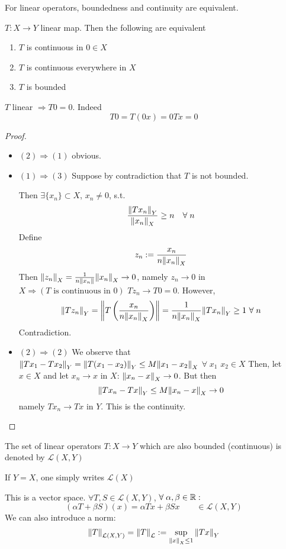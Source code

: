 For linear operators, boundedness and continuity are equivalent.
\begin{theorem}
    \(T:X \to Y\) linear map. Then the following are equivalent
    \begin{enumerate}
        \item \(T\) is continuous in \(0 \in X\)
        \item \(T\) is continuous everywhere in \(X\)
        \item \(T\) is bounded
    \end{enumerate}
\end{theorem}
\begin{remark}
    \(T\) linear \(\Rightarrow T0 = 0\). Indeed
    \[
        T0 = T(0x) =  0 Tx = 0
    \]
\end{remark}
\begin{proof}
    
    \begin{itemize}
        \item \((2) \Rightarrow (1)\) obvious.
        \item \((1) \Rightarrow (3)\) Suppose by contradiction that \(T\) is not bounded. 
        
        Then \(\exists \{ x_n \} \subset X \), \(x_n \neq 0\), s.t. 
        \[
            \frac{\norm{T x_n}_Y}{\norm{x_n}_X} \geq n \quad \forall\; n
        \]
        Define
        \[
            z_n := \frac{x_n}{n \norm{x_n}_X}
        \]
        Then \(\norm{z_n }_X = \frac{1}{n \norm{x_n}} \norm{x_n}_X \to 0\),
        namely \(z_n \to 0 \) in \( X \Rightarrow (T \text{ is continuous in }0)\) \(T z_n \to T0 =0\).
        However, 
        \[
            \norm{T z_n}_Y = \norm{T\left(\frac{x_n}{n \norm{x_n}_X}\right)} = \frac{1}{n \norm{x_n}_X} \norm{T x_n}_Y \geq 1 \ \forall\; n
        \]
        Contradiction.
        \item \((2) \Rightarrow (2)\) 
        We observe that \(\norm{Tx_1 - Tx_2}_Y = \norm{T(x_1 - x_2)}_Y \leq M \norm{x_1 - x_2}_X \) \(\forall \; x_1\) \(x_2 \in X\)
        Then, let \(x \in X \) and let \(x_n \to x\) in \(X\): \(\norm{x_n - x}_X \to 0\). But then
        \[
            \norm{T x_n - Tx}_Y \leq M \norm{x_n - x}_X \to 0
        \]
        namely \(Tx_n \to Tx \) in \(Y\). This is the continuity.
    \end{itemize}
\end{proof}

\begin{definition}
    The set of linear operators \(T : X \to Y\) which are also bounded (continuous) is denoted by \(\mathcal{L}(X, Y)\)

    If \(Y=X\), one simply writes \(\mathcal{L}(X)\)
\end{definition}
This is a vector space. \( \forall T, S \in \mathcal{L}(X, Y) \), \(\forall\; \alpha, \beta \in \mathbb{R}:\)
\[
     (\alpha T + \beta S)(x) = \alpha Tx + \beta Sx \qquad \in \mathcal{L}(X, Y)
\]
We can also introduce a norm:
\[
    \norm{T}_{\mathcal{L}(X, Y)} = \norm{T}_\mathcal{L} := \sup_{\norm{x}_X \leq 1} \norm{Tx}_Y
\]

